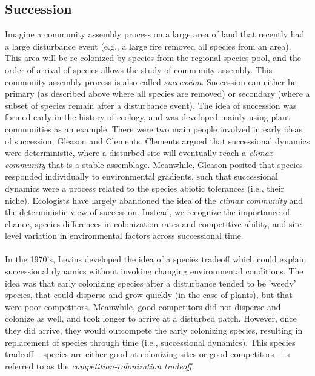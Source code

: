 \documentclass[12pt]{article}
\begin{document}
\subsection*{Succession}

Imagine a community assembly process on a large area of land that recently had a large disturbance event (e.g., a large fire removed all species from an area). This area will be re-colonized by species from the regional species pool, and the order of arrival of species allows the study of community assembly. This community assembly process is also called \textit{succession}. Succession can either be primary (as described above where all species are removed) or secondary (where a subset of species remain after a disturbance event). The idea of succession was formed early in the history of ecology, and was developed mainly using plant communities as an example. There were two main people involved in early ideas of succession; Gleason and Clements. Clements argued that successional dynamics were deterministic, where a disturbed site will eventually reach a \textit{climax community} that is a stable assemblage. Meanwhile, Gleason posited that species responded individually to environmental gradients, such that successional dynamics were a process related to the species abiotic tolerances (i.e., their niche). Ecologists have largely abandoned the idea of the \textit{climax community} and the deterministic view of succession. Instead, we recognize the importance of chance, species differences in colonization rates and competitive ability, and site-level variation in environmental factors across successional time. 


\paragraph*{}
In the 1970's, Levins developed the idea of a species tradeoff which could explain successional dynamics without invoking changing environmental conditions. The idea was that early colonizing species after a disturbance tended to be 'weedy' species, that could disperse and grow quickly (in the case of plants), but that were poor competitors. Meanwhile, good competitors did not disperse and colonize as well, and took longer to arrive at a disturbed patch. However, once they did arrive, they would outcompete the early colonizing species, resulting in replacement of species through time (i.e., successional dynamics). This species tradeoff -- species are either good at colonizing sites or good competitors -- is referred to as the \textit{competition-colonization tradeoff}. 
\end{document}
